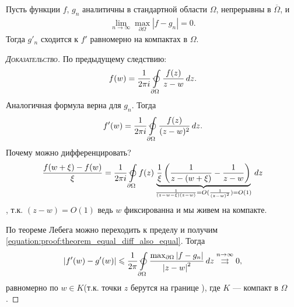\documentclass[../complex-analysis.tex]{subfiles}
\begin{document}
\begin{thm}
 Пусть функции $ f $, $ g_n $ аналитичны в стандартной области $ \Omega $, непрерывны в $ \overline \Omega $, и
 \begin{align*}
  \lim_{n \to \infty} \max_{\partial\Omega} \left| f-g_n \right| = 0.
 \end{align*} Тогда $ g'_n $ сходится к $ f' $ равномерно на компактах в $ \Omega $.
\end{thm}
\begin{proof}[\normalfont\textsc{Доказательство}]
 По предыдущему следствию:
 \begin{align*}
  f(w) = \frac{1}{2\pi i} \varointctrclockwise\limits_{\partial\Omega} \frac{f(z)}{z-w}\,dz.
 \end{align*} Аналогичная формула верна для $ g_n $. Тогда
 \begin{align}
  \label{equation:proof:theorem_equal_diff_also_equal}
	 f'(w) = \frac{1}{2\pi i} \varointctrclockwise\limits_{\partial\Omega} \frac{f(z)}{(z-w)^{2}}\,dz.
 \end{align} Почему можно дифференцировать?
 \begin{align*}
  \frac{f(w+\xi)-f(w)}{\xi} = \frac{1}{2\pi i} \varointctrclockwise\limits_{\partial \Omega} f(z) \underbrace{\frac{1}{\xi} \left( \frac{1}{z-(w+\xi)} - \frac{1}{z - w} \right)}_{\frac{1}{(z-w-\xi)(z-w)} = O(\frac{1}{(z-w)^{2}}) = O(1)}\,dz
 \end{align*}, т.к. $(z - w) = O(1)$ ведь $w$ фиксированна и мы живем на компакте.  

 По теореме Лебега можно переходить к пределу и получим \eqref{equation:proof:theorem_equal_diff_also_equal}. Тогда
 \begin{align*}
	 \left| f'(w) - g'(w) \right| \leqslant \frac{1}{2\pi} \varointctrclockwise\limits_{\partial\Omega} \frac{\max_{\partial\Omega} \left| f-g_n \right|}{\left| z-w \right|^{2}}\,dz \overset{n \to \infty}{\rightrightarrows} 0,
 \end{align*} равномерно по $ w \in K $(т.к. точки $z$ берутся на границе ), где $ K $ --- компакт в $ \Omega $.
\end{proof}
\end{document}
